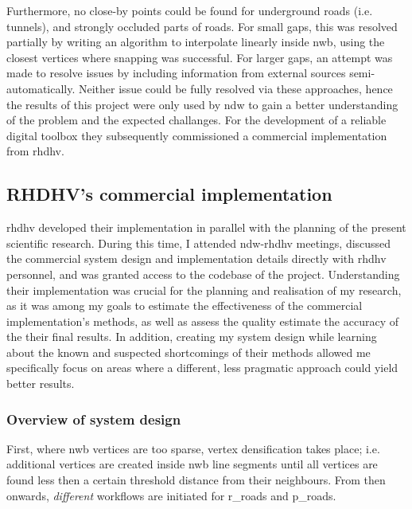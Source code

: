 Furthermore, no close-by points could be found for underground roads (i.e. tunnels), and strongly occluded parts of roads. For small gaps, this was resolved partially by writing an algorithm to interpolate linearly inside \ac{nwb}, using the closest vertices where snapping was successful. For larger gaps, an attempt was made to resolve issues by including information from external sources semi-automatically. Neither issue could be fully resolved via these approaches, hence the results of this project were only used by \ac{ndw} to gain a better understanding of the problem and the expected challanges. For the development of a reliable digital toolbox they subsequently commissioned a commercial implementation from \ac{rhdhv}.

\subsection{RHDHV's commercial implementation}
\label{sub:commercialproduct}

\ac{rhdhv} developed their implementation in parallel with the planning of the present scientific research. During this time, I attended \ac{ndw}-\ac{rhdhv} meetings, discussed the commercial system design and implementation details directly with \ac{rhdhv} personnel, and was granted access to the codebase of the project. Understanding their implementation was crucial for the planning and realisation of my research, as it was among my goals to estimate the effectiveness of the commercial implementation's methods, as well as assess the quality estimate the accuracy of the their final results. In addition, creating my system design while learning about the known and suspected shortcomings of their methods allowed me specifically focus on areas where a different, less pragmatic approach could yield better results.

\subsubsection{Overview of system design}

First, where \ac{nwb} vertices are too sparse, vertex densification takes place; i.e. additional vertices are created inside \ac{nwb} line segments until all vertices are found less then a certain threshold distance from their neighbours. From then onwards, \textit{different} workflows are initiated for \ac{r_roads} and \ac{p_roads}.

